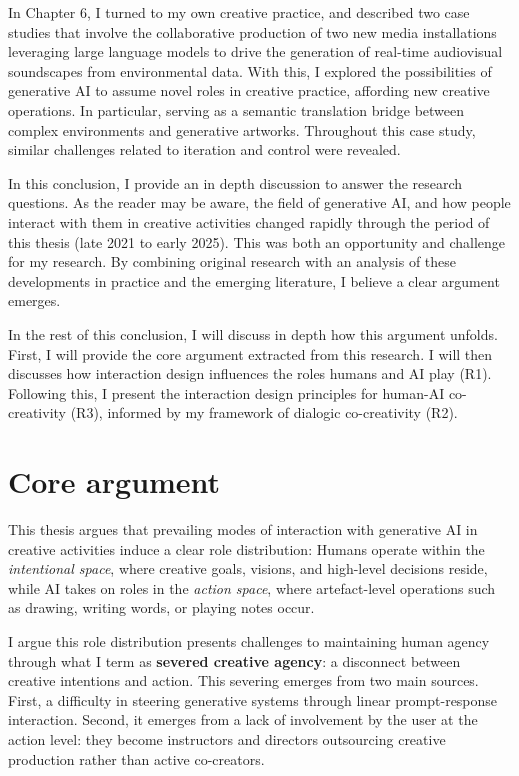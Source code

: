 In Chapter 6, I turned to my own creative practice, and described two case studies that involve the collaborative production of two new media installations leveraging large language models to drive the generation of real-time audiovisual soundscapes from environmental data. With this, I explored the possibilities of generative AI to assume novel roles in creative practice, affording new creative operations. In particular, serving as a semantic translation bridge between complex environments and generative artworks. Throughout this case study, similar challenges related to iteration and control were revealed.

In this conclusion, I provide an in depth discussion to answer the research questions. As the reader may be aware, the field of generative AI, and how people interact with them in creative activities changed rapidly through the period of this thesis (late 2021 to early 2025). This was both an opportunity and challenge for my research. By combining original research with an analysis of these developments in practice and the emerging literature, I believe a clear argument emerges.

In the rest of this conclusion, I will discuss in depth how this argument unfolds. First, I will provide the core argument extracted from this research. I will then discusses how interaction design influences the roles humans and AI play (R1). Following this, I present the interaction design principles for human-AI co-creativity (R3), informed by my framework of dialogic co-creativity (R2).


\section{Core argument}

This thesis argues that prevailing modes of interaction with generative AI in creative activities induce a clear role distribution: Humans operate within the \textit{intentional space}, where creative goals, visions, and high-level decisions reside, while AI takes on roles in the \textit{action space}, where artefact-level operations such as drawing, writing words, or playing notes occur.

I argue this role distribution presents challenges to maintaining human agency through what I term as \textbf{severed creative agency}: a disconnect between creative intentions and action. This severing emerges from two main sources. First, a difficulty in steering generative systems through linear prompt-response interaction. Second, it emerges from a lack of involvement by the user at the action level: they become instructors and directors outsourcing creative production rather than active co-creators.

